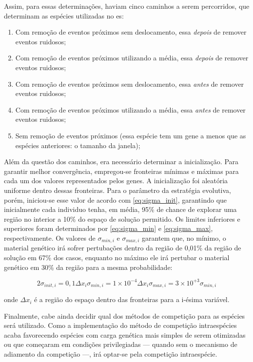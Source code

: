 Assim, para essas determinações, haviam cinco caminhos a serem
percorridos, que determinam as espécies utilizadas no \acs{es}: 

\begin{enumerate}[label={Espécie} (\Roman*) -,ref=(\Roman*),align=left]
\item\label{item:esp1} Com remoção de eventos próximos sem
deslocamento, essa \emph{depois} de remover eventos ruidosos;
\item\label{item:esp2} Com remoção de eventos próximos utilizando a
média, essa \emph{depois} de remover eventos ruidosos;
\item\label{item:esp3} Com remoção de eventos próximos sem
deslocamento, essa \emph{antes} de remover eventos ruidosos;
\item\label{item:esp4} Com remoção de eventos próximos utilizando a
média, essa \emph{antes} de remover eventos ruidosos;
\item\label{item:esp5} Sem remoção de eventos próximos (essa espécie tem um gene a
menos que as espécies anteriores: o tamanho da janela); 
\end{enumerate}

Além da questão dos caminhos, era necessário determinar a
inicialização. Para garantir melhor convergência, empregou-se
fronteiras mínimas e máximas para cada um dos valores representados
pelos genes. A inicialização foi aleatória uniforme dentro dessas
fronteiras. Para o parâmetro da estratégia evolutiva, porém,
iniciou-se esse valor de acordo com \ref{eq:sigma_init}, garantindo
que inicialmente cada individuo tenha, em média, 95\% de chance de
explorar uma região no interior a 10\% do espaço de solução permitido. Os
limites inferiores e superiores foram determinados por
\ref{eq:sigma_min} e \ref{eq:sigma_max}, respectivamente. Os valores
de $\sigma_{min,i}$ e $\sigma_{max,i}$ garantem que, no mínimo, o material
genético irá sofrer pertubações dentro da região de 0,01\% da região
de solução em 67\% dos casos, enquanto no máximo ele irá pertubar o
material genético em 30\% da região para a mesma probabilidade:

\begin{subequations}
\begin{equation}\label{eq:sigma_init}
2\sigma_{init,i}=0,1\Delta x_i
\end{equation}
\begin{equation}\label{eq:sigma_min}
\sigma_{min,i}=1\times10^{-4}\Delta x_i
\end{equation}
\begin{equation}\label{eq:sigma_max}
\sigma_{max,i}=3\times10^{+3}\sigma_{min,i}
\end{equation}
\end{subequations}

\noindent onde $\Delta x_i$ é a região do espaço dentro das fronteiras
para a i-ésima variável.

Finalmente, cabe ainda decidir qual dos métodos de competição para as
espécies será utilizado. Como a implementação do método de competição
intraespécies acaba favorecendo espécies com carga genética mais
simples de serem otimizadas ou que começaram em condições 
privilegiadas --- quando sem o mecanismo de adiamento da competição
---, irá optar-se pela competição intraespécie.

